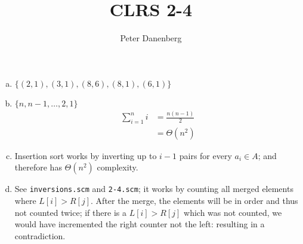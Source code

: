 \documentclass{article}
\title{CLRS 2-4}
\author{Peter Danenberg}
\begin{document}
\maketitle

\begin{enumerate}[a.]
\item $\{(2,1), (3,1), (8,6), (8,1), (6,1)\}$
\item $\{n,n-1,\dots,2,1\}$
  \begin{align}
    \sum_{i=1}^ni&=\frac{n(n-1)}{2}\\
    &=\Theta(n^2)
  \end{align}
\item Insertion sort works by inverting up to $i - 1$ pairs for every
  $a_i \in A$; and therefore has $\Theta(n^2)$ complexity.
\item See \texttt{inversions.scm} and \texttt{2-4.scm}; it works by
  counting all merged elements where $L[i] > R[j]$. After the merge,
  the elements will be in order and thus not counted twice; if there
  is a $L[i] > R[j]$ which was not counted, we would have incremented
  the right counter not the left: resulting in a contradiction.
\end{enumerate}
\end{document}
